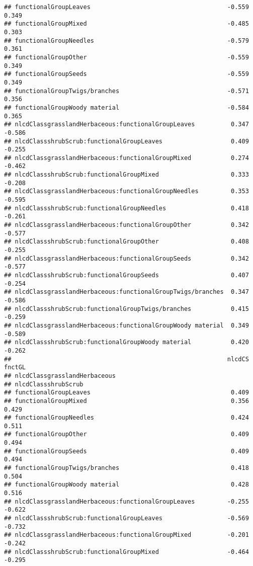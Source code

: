 \documentclass[]{article}
\begin{document}
\begin{verbatim}
## functionalGroupLeaves                                      -0.559  0.349
## functionalGroupMixed                                       -0.485  0.303
## functionalGroupNeedles                                     -0.579  0.361
## functionalGroupOther                                       -0.559  0.349
## functionalGroupSeeds                                       -0.559  0.349
## functionalGroupTwigs/branches                              -0.571  0.356
## functionalGroupWoody material                              -0.584  0.365
## nlcdClassgrasslandHerbaceous:functionalGroupLeaves          0.347 -0.586
## nlcdClassshrubScrub:functionalGroupLeaves                   0.409 -0.255
## nlcdClassgrasslandHerbaceous:functionalGroupMixed           0.274 -0.462
## nlcdClassshrubScrub:functionalGroupMixed                    0.333 -0.208
## nlcdClassgrasslandHerbaceous:functionalGroupNeedles         0.353 -0.595
## nlcdClassshrubScrub:functionalGroupNeedles                  0.418 -0.261
## nlcdClassgrasslandHerbaceous:functionalGroupOther           0.342 -0.577
## nlcdClassshrubScrub:functionalGroupOther                    0.408 -0.255
## nlcdClassgrasslandHerbaceous:functionalGroupSeeds           0.342 -0.577
## nlcdClassshrubScrub:functionalGroupSeeds                    0.407 -0.254
## nlcdClassgrasslandHerbaceous:functionalGroupTwigs/branches  0.347 -0.586
## nlcdClassshrubScrub:functionalGroupTwigs/branches           0.415 -0.259
## nlcdClassgrasslandHerbaceous:functionalGroupWoody material  0.349 -0.589
## nlcdClassshrubScrub:functionalGroupWoody material           0.420 -0.262
##                                                            nlcdCS fnctGL
## nlcdClassgrasslandHerbaceous                                            
## nlcdClassshrubScrub                                                     
## functionalGroupLeaves                                       0.409       
## functionalGroupMixed                                        0.356  0.429
## functionalGroupNeedles                                      0.424  0.511
## functionalGroupOther                                        0.409  0.494
## functionalGroupSeeds                                        0.409  0.494
## functionalGroupTwigs/branches                               0.418  0.504
## functionalGroupWoody material                               0.428  0.516
## nlcdClassgrasslandHerbaceous:functionalGroupLeaves         -0.255 -0.622
## nlcdClassshrubScrub:functionalGroupLeaves                  -0.569 -0.732
## nlcdClassgrasslandHerbaceous:functionalGroupMixed          -0.201 -0.242
## nlcdClassshrubScrub:functionalGroupMixed                   -0.464 -0.295

\end{verbatim}
\end{document}
